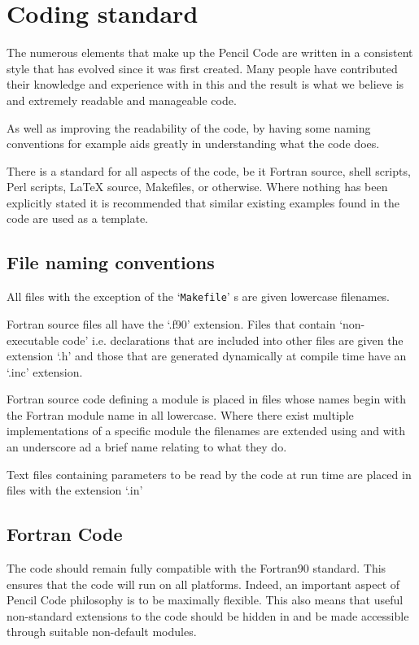 \documentclass[\mydriver,12pt,twoside,notitlepage,a4paper]{article}
\makeatletter
\newcommand{\file}[2][]{%
  \def\index@{#1}%
  `\texttt{#2}'%
  \ifx\index@\@empty\index[file]{#2@\texttt{#2}}%
  \else\index[file]{#1@\texttt{#1}}%
  \fi%
}
\makeatother
\begin{document}
\section{Coding standard}
\label{coding-standard}

The numerous elements that make up the {\sc Pencil Code} are written
in a consistent style that has evolved since it was first created.
Many people have contributed their knowledge and experience with
in this and the result is what we believe is and extremely
readable and manageable code.

As well as improving the readability of the code, by having some
naming conventions for example aids greatly in understanding what
the code does.

There is a standard for all aspects of the code, be it Fortran source,
shell scripts, Perl scripts, LaTeX source, Makefiles, or otherwise.
Where nothing has been explicitly stated it is recommended that
similar existing examples found in the code are used as a template.

\subsection{File naming conventions}
All files with the exception of the \file{Makefile}s are given
lowercase filenames.

Fortran source files all have the `.f90' extension.  Files that
contain `non-executable code' i.e. declarations that are included into
other files are given the extension `.h' and those that are generated
dynamically at compile time have an `.inc' extension.

Fortran source code defining a module is placed in files whose names
begin with the Fortran module name in all lowercase.  Where there
exist multiple implementations of a specific module the filenames
are extended using and with an underscore ad a brief name relating
to what they do.

Text files containing parameters to be read by the code at run time are
placed in files with the extension `.in'


\subsection{Fortran Code}
\label{CodingStandards}

The code should remain fully compatible with the Fortran90 standard.
This ensures that the code will run on all platforms.
Indeed, an important aspect of {\sc Pencil Code} philosophy is to be maximally flexible.
This also means that useful non-standard extensions to the code should be hidden in and
be made accessible through suitable non-default modules.
\end{document}
